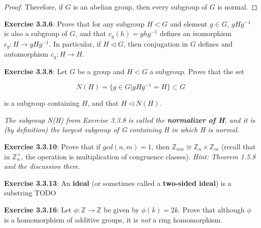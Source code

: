 \documentclass[a4paper]{article}
\begin{document}
\begin{myparindent}{0pt}
\begin{proof}
Therefore, if $G$ is an abelian group, then every subgroup of $G$ is normal.
\end{proof}

\textbf{Exercise 3.3.6}:
Prove that for any subgroup $H < G$ and element $g \in G$, $gHg^{-1}$ is also
a subgroup of $G$, and that $c_g(h) = ghg^{-1}$ defines an isomorphism
$c_g: H \rightarrow gHg^{-1}$. In particular, if $H \triangleleft G$, then
conjugation in $G$ defines and automorphism $c_g: H \rightarrow H$.
\newline

\textbf{Exercise 3.3.8}:
Let $G$ be a group and $H < G$ a subgroup. Prove that the set

\[ N(H) = \{g \in G | gHg^{-1} = H \} \subset G \]
\newline

is a subgroup containing $H$, and that $H \triangleleft N(H)$.

\textit{The subgroup N(H) from Exercise 3.3.8 is called the
\textbf{normalizer of H}, and it is (by definition) the largest subgroup of G
containing H in which H is normal}.
\newline

\textbf{Exercise 3.3.10}:
Prove that if $gcd(n, m) = 1$, then
$\mathbb{Z}_{nm} \cong \mathbb{Z}_n \times \mathbb{Z}_m$
(recall that in $\mathbb{Z}_n^\times$, the operation is multiplication of
congruence classes). \textit{Hint: Theorem 1.5.8 and the discussion there}.
\newline

\textbf{Exercise 3.3.13}:
An \textbf{ideal} (or sometimes called a \textbf{two-sided ideal}) is a
substring TODO
\newline

\textbf{Exercise 3.3.16}:
Let $\phi: \mathbb{Z} \rightarrow \mathbb{Z}$ be given by $\phi(k) = 2k$. Prove
that although $\phi$ is a homomorphism of additive groups, it is \textit{not}
a ring homomorphism.

\end{myparindent}
\end{document}
